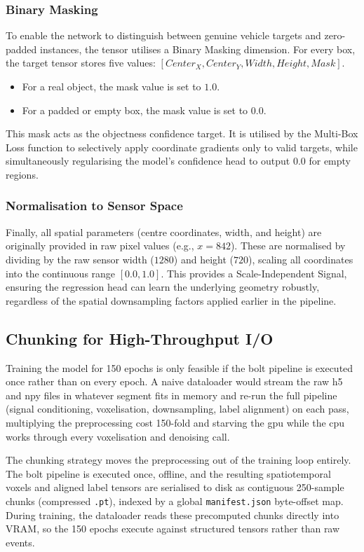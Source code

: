 \subsubsection{Binary Masking}
To enable the network to distinguish between genuine vehicle targets and zero-padded instances, the tensor utilises a Binary Masking dimension. 
For every box, the target tensor stores five values: $[Center_X, Center_Y, Width, Height, Mask]$.
\begin{itemize}
    \item For a real object, the mask value is set to $1.0$.
    \item For a padded or empty box, the mask value is set to $0.0$.
\end{itemize}
This mask acts as the objectness confidence target. 
It is utilised by the Multi-Box Loss function to selectively apply coordinate gradients only to valid targets, while simultaneously regularising the model's confidence head to output $0.0$ for empty regions.

\subsubsection{Normalisation to Sensor Space}
Finally, all spatial parameters (centre coordinates, width, and height) are originally provided in raw pixel values (e.g., $x=842$). 
These are normalised by dividing by the raw sensor width ($1280$) and height ($720$), scaling all coordinates into the continuous range $[0.0, 1.0]$. 
This provides a Scale-Independent Signal, ensuring the regression head can learn the underlying geometry robustly, regardless of the spatial downsampling factors applied earlier in the pipeline.

\subsection{Chunking for High-Throughput I/O}
\label{subsec:chunking}

Training the model for 150 epochs is only feasible if the \gls{bolt} pipeline is executed once rather than on every epoch.
A naive dataloader would stream the raw h5 and npy files in whatever segment fits in memory and re-run the full pipeline (signal conditioning, voxelisation, downsampling, label alignment) on each pass, multiplying the preprocessing cost 150-fold and starving the \gls{gpu} while the \gls{cpu} works through every voxelisation and denoising call.

The chunking strategy moves the preprocessing out of the training loop entirely.
The \gls{bolt} pipeline is executed once, offline, and the resulting spatiotemporal voxels and aligned label tensors are serialised to disk as contiguous 250-sample chunks (compressed \texttt{.pt}), indexed by a global \texttt{manifest.json} byte-offset map.
During training, the dataloader reads these precomputed chunks directly into VRAM, so the 150 epochs execute against structured tensors rather than raw events.

